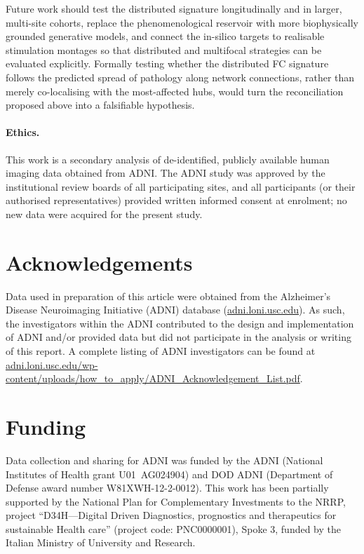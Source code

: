 \documentclass[11pt]{article}
\begin{document}
Future work should test the distributed signature longitudinally and in larger,
multi-site cohorts, replace the phenomenological reservoir with more
biophysically grounded generative models, and connect the in-silico targets to
realisable stimulation montages so that distributed and multifocal strategies
can be evaluated explicitly. Formally testing whether the distributed FC
signature follows the predicted spread of pathology along network connections,
rather than merely co-localising with the most-affected hubs, would turn the
reconciliation proposed above into a falsifiable hypothesis.

\paragraph{Ethics.}
This work is a secondary analysis of de-identified, publicly available human
imaging data obtained from ADNI. The ADNI study was approved by the
institutional review boards of all participating sites, and all participants
(or their authorised representatives) provided written informed consent at
enrolment; no new data were acquired for the present study.

\section*{Acknowledgements}
Data used in preparation of this article were obtained from the Alzheimer's
Disease Neuroimaging Initiative (ADNI) database
(\href{https://adni.loni.usc.edu}{adni.loni.usc.edu}). As such, the
investigators within the ADNI contributed to the design and implementation of
ADNI and/or provided data but did not participate in the analysis or writing of
this report. A complete listing of ADNI investigators can be found at
\href{https://adni.loni.usc.edu/wp-content/uploads/how_to_apply/ADNI_Acknowledgement_List.pdf}%
{adni.loni.usc.edu/wp-content/uploads/how\_to\_apply/ADNI\_Acknowledgement\_List.pdf}.

\section*{Funding}
Data collection and sharing for ADNI was funded by the ADNI (National Institutes
of Health grant U01~AG024904) and DOD ADNI (Department of Defense award number
W81XWH-12-2-0012).
This work has been partially supported by the National Plan for Complementary
Investments to the NRRP, project ``D34H---Digital Driven Diagnostics, prognostics
and therapeutics for sustainable Health care'' (project code: PNC0000001), Spoke
3, funded by the Italian Ministry of University and Research.
\end{document}
